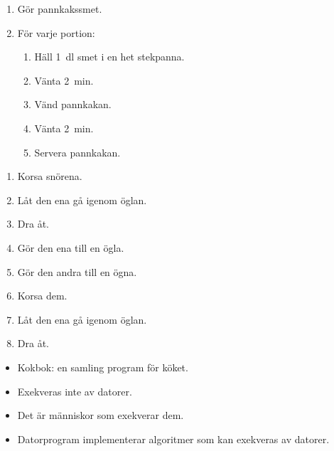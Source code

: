 \begin{frame}
  \begin{example}
    \begin{enumerate}
      \item Gör pannkakssmet.
      \item För varje portion:
        \begin{enumerate}
          \item Häll \SI{1}{\deci\litre} smet i en het stekpanna.
          \item Vänta \SI{2}{\minute}.
          \item Vänd pannkakan.
          \item Vänta \SI{2}{\minute}.
          \item Servera pannkakan.
        \end{enumerate}
    \end{enumerate}
  \end{example}
\end{frame}

\begin{frame}
  \begin{example}
    \begin{enumerate}
      \item Korsa snörena.
      \item Låt den ena gå igenom öglan.
      \item Dra åt.
      \item Gör den ena till en ögla.
      \item Gör den andra till en ögna.
      \item Korsa dem.
      \item Låt den ena gå igenom öglan.
      \item Dra åt.
    \end{enumerate}
  \end{example}
\end{frame}

\begin{frame}
  \begin{remark}
    \begin{itemize}
      \item Kokbok: en samling program för köket.
      \item Exekveras inte av datorer.
      \item Det är människor som exekverar dem.
    \end{itemize}
  \end{remark}

  \pause

  \begin{remark}
    \begin{itemize}
      \item Datorprogram implementerar algoritmer som kan exekveras av datorer.
    \end{itemize}
  \end{remark}
\end{frame}

